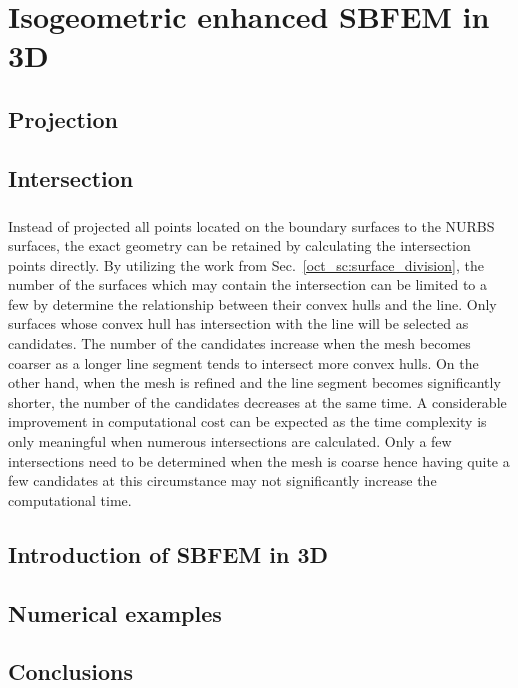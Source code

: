 
\chapter{Isogeometric enhanced SBFEM in 3D}


\section{Projection}




\section{Intersection}
\paragraph{}
Instead of projected all points located on the boundary surfaces to the NURBS surfaces, the exact geometry can be retained by calculating the intersection points directly.
By utilizing the work from Sec.~\ref{oct_sc:surface_division}, the number of the surfaces which may contain the intersection can be limited to a few by determine the relationship between their convex hulls and the line.
Only surfaces whose convex hull has intersection with the line will be selected as candidates.
The number of the candidates increase when the mesh becomes coarser as a longer line segment tends to intersect more convex hulls.
On the other hand, when the mesh is refined and the line segment becomes significantly shorter, the number of the candidates decreases at the same time.
A considerable improvement in computational cost can be expected as the time complexity is only meaningful when numerous intersections are calculated.
Only a few intersections need to be determined when the mesh is coarse hence having quite a few candidates at this circumstance may not significantly increase the computational time.




\section{Introduction of SBFEM in 3D}


\section{Numerical examples}




\section{Conclusions}